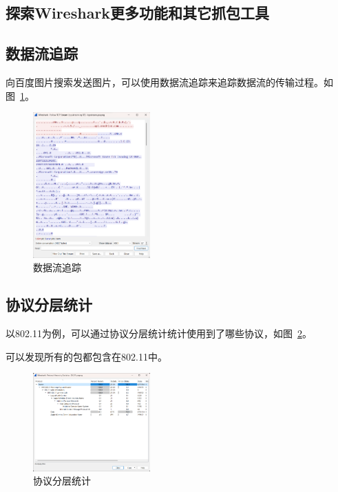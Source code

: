 \documentclass[a4paper,twoside]{article}
\begin{document}
\begin{spacing}{1.2}
\clearpage
\section{探索Wireshark更多功能和其它抓包工具}

\subsection{数据流追踪}

向百度图片搜索发送图片，可以使用数据流追踪来追踪数据流的传输过程。如图~\ref{fig:dt_tr}。

\begin{figure}[htb]
	\centering
	\caption{数据流追踪}
	\label{fig:dt_tr}
	\includegraphics[width=0.4\textwidth]{stream.png}
\end{figure}

\subsection{协议分层统计}

以802.11为例，可以通过协议分层统计统计使用到了哪些协议，如图~\ref{fig:ph}。

可以发现所有的包都包含在802.11中。

\begin{figure}[htb]
	\centering
	\caption{协议分层统计}
	\label{fig:ph}
	\includegraphics[width=0.4\textwidth]{ph.png}
\end{figure}

\end{spacing}
\end{document}

